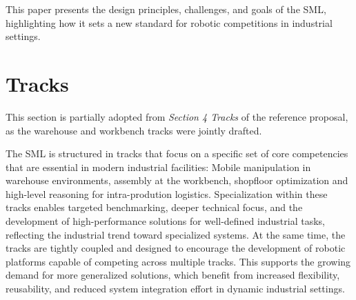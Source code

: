 \documentclass[letterpaper, 11pt]{extarticle}
\begin{document}
This paper presents the design principles, challenges, and goals of the SML, highlighting how it sets a new standard for robotic competitions in industrial settings.





\section{Tracks}
\begin{tcolorbox}[disclaimerbox, title=Disclaimer]
This section is partially adopted from \emph{Section 4 Tracks} of the reference proposal, as the warehouse and workbench tracks were jointly drafted.
\end{tcolorbox}
The SML is structured in tracks that focus on a specific set of core competencies that are essential in modern industrial facilities: Mobile manipulation in warehouse environments, assembly at the workbench, shopfloor optimization and high-level reasoning for intra-prodution logistics.
Specialization within these tracks enables targeted benchmarking, deeper technical focus, and the development of high-performance solutions for well-defined industrial tasks, reflecting the industrial trend toward specialized systems.
At the same time, the tracks are tightly coupled and designed to encourage the development of robotic platforms capable of competing across multiple tracks. This supports the growing demand for more generalized solutions, which benefit from increased flexibility, reusability, and reduced system integration effort in dynamic industrial settings.
\end{document}
